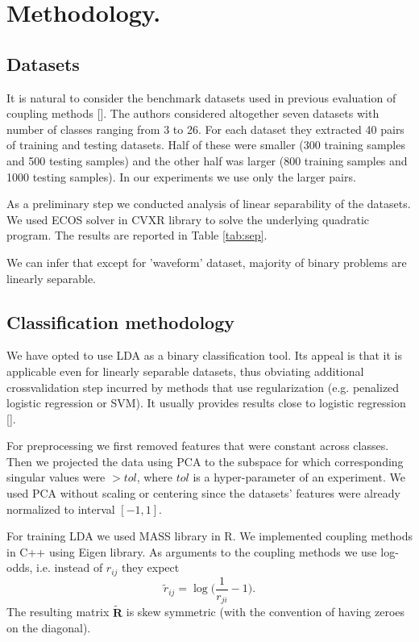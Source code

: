 \section{Methodology.}

\subsection{Datasets}

It is natural to consider the benchmark datasets used in previous evaluation of coupling methods [\cite{wu2004probability}]. The authors considered altogether seven datasets with number of classes ranging from 3 to 26. For each dataset they extracted 40 pairs of training and testing datasets. Half of these were smaller (300 training samples and 500 testing samples) and the other half was larger (800 training samples and 1000 testing samples). In our experiments we use only the larger pairs. 

As a preliminary step we conducted analysis of linear separability of the datasets. We used ECOS solver in CVXR library to solve the underlying quadratic program. The results are reported in Table \ref{tab:sep}.



We can infer that except for 'waveform' dataset, majority of binary problems are linearly separable.

\subsection{Classification methodology}

We have opted to use LDA as a binary classification tool. Its appeal is that it is applicable even for linearly separable datasets, thus obviating additional crossvalidation step incurred by methods that use regularization (e.g. penalized logistic regression or SVM). It usually provides results close to logistic regression [\cite{james2013introduction}].

For preprocessing we first removed features that were constant across classes. Then we projected the data using PCA to the subspace for which corresponding singular values were $> tol$, where $tol$ is a hyper-parameter of an experiment. We used PCA without scaling or centering since the datasets' features were already normalized to interval $[-1,1]$. 

For training LDA we used MASS library in R. We implemented coupling methods in C++ using Eigen library. As arguments to the coupling methods we use log-odds, i.e. instead of $r_{ij}$ they expect
$$
\tilde r_{ij} = \log \biggl(\frac{1}{r_{ji}} - 1\biggr).
$$
The resulting matrix $\tilde{\boldsymbol{R}}$ is skew symmetric (with the convention of having zeroes on the diagonal).


